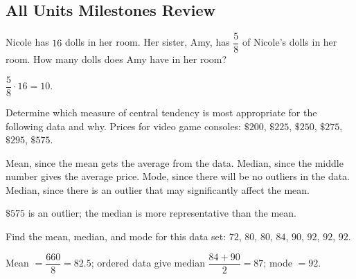 

\subsection*{All Units Milestones Review}

\question[5]
Nicole has $16$ dolls in her room. Her sister, Amy, has $\dfrac{5}{8}$ of Nicole's dolls in her room. How many dolls does Amy have in her room?
\begin{solution}
  $\dfrac{5}{8}\cdot 16 = 10$.
\end{solution}

\question[5]
Determine which measure of central tendency is most appropriate for the following data and why. Prices for video game consoles: $\$200$, $\$225$, $\$250$, $\$275$, $\$295$, $\$575$.
\begin{choices}
  \choice Mean, since the mean gets the average from the data.
  \choice Median, since the middle number gives the average price.
  \choice Mode, since there will be no outliers in the data.
  \CorrectChoice Median, since there is an outlier that may significantly affect the mean.
\end{choices}
\begin{solution}
  $\$575$ is an outlier; the median is more representative than the mean.
\end{solution}

\question[10]
Find the mean, median, and mode for this data set: $72$, $80$, $80$, $84$, $90$, $92$, $92$, $92$.
\begin{solution}
  Mean $=\dfrac{660}{8}=82.5$; ordered data give median $\dfrac{84+90}{2}=87$; mode $=92$.
\end{solution}

